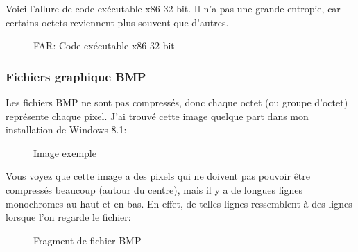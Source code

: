 Voici l'allure de code exécutable x86 32-bit.
Il n'a pas une grande entropie, car certains octets reviennent plus souvent que d'autres.

\begin{figure}[H]
\centering
{}
\caption{FAR: Code exécutable x86 32-bit}
\end{figure}


\clearpage
\subsubsection{Fichiers graphique BMP}


Les fichiers BMP ne sont pas compressés, donc chaque octet (ou groupe d'octet) représente
chaque pixel.
J'ai trouvé cette image quelque part dans mon installation de Windows 8.1:

\begin{figure}[H]
\centering
{}
\caption{Image exemple}
\end{figure}

Vous voyez que cette image a des pixels qui ne doivent pas pouvoir être compressés
beaucoup (autour du centre), mais il y a de longues lignes monochromes au haut et
en bas.
En effet, de telles lignes ressemblent à des lignes lorsque l'on regarde le fichier:

\begin{figure}[H]
\centering
{}
\caption{Fragment de fichier BMP}
\end{figure}

